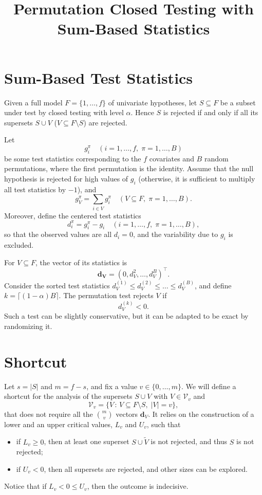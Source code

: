 \documentclass[11pt,a4paper,openright,twoside]{article}
\title{Permutation Closed Testing with Sum-Based Statistics}
\author{}
\date{}
\begin{document}
\maketitle


\section{Sum-Based Test Statistics}
Given a full model $F=\{1,\ldots, f\}$ of univariate hypotheses, let $S\subseteq F$ be a subset under test by closed testing with level $\alpha$. Hence $S$ is rejected if and only if all its supersets $S\cup V$ ($V\subseteq F\setminus S$) are rejected.

Let
\[g_i^\pi\quad (i=1,\ldots,f,\; \pi=1,\ldots,B)\]
be some test statistics corresponding to the $f$ covariates and $B$ random permutations, where the first permutation is the identity. Assume that the null hypothesis is rejected for high values of $g_i$ (otherwise, it is sufficient to multiply all test statistics by $-1$), and
\[g_V^\pi=\sum_{i\in V}g_i^\pi\quad (V\subseteq F,\;\pi=1,\ldots,B).\]
Moreover, define the centered test statistics
\[d_i^\pi = g_i^\pi - g_i \quad (i=1,\ldots,f,\; \pi=1,\ldots,B),\]
so that the observed values are all $d_i=0$, and the variability due to $g_i$ is excluded.

For $V\subseteq F$, the vector of its statistics is
\[\mathbf{d_V}=(0,d_V^2,\ldots,d_V^B)^\top.\]
Consider the sorted test statistics $d_V^{(1)}\leq d_V^{(2)}\leq\ldots\leq d_V^{(B)}$, and define $k=\lceil (1-\alpha) B\rceil$. The permutation test rejects $V$ if
\[d_V^{(k)}< 0.\]
Such a test can be slightly conservative, but it can be adapted to be exact by randomizing it.







\vspace{10mm}

\section{Shortcut}
Let $s=|S|$ and $m=f-s$, and fix a value $v\in\{0,\ldots,m\}$. We will define a shortcut for the analysis of the supersets $S\cup V$ with $V\in\mathcal{V}_v$ and
\[\mathcal{V}_v=\{V\,:\,V\subseteq F\setminus S,\; |V|=v\},\]
that does not require all the $\binom{m}{v}$ vectors $\mathbf{d}_{V}$. It relies on the construction of a lower and an upper critical values, $L_v$ and $U_v$, such that
\begin{itemize}
\item if $L_v\geq 0$, then at least one superset $S\cup\tilde{V}$ is not rejected, and thus $S$ is not rejected;
\item if $U_v<0$, then all supersets are rejected, and other sizes can be explored.
\end{itemize}
Notice that if $L_v< 0\leq U_v$, then the outcome is indecisive. 
\end{document}
